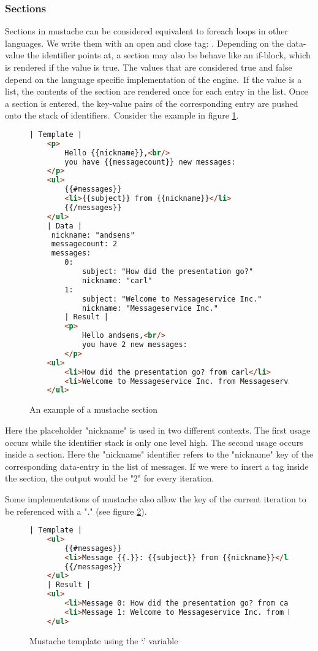 \subsubsection{Sections}
Sections in mustache can be considered equivalent to foreach loops in other
languages. We write them with an open and close tag:
.
Depending on the data-value the identifier points at, a section may also be
behave like an if-block, which is rendered if the value is true. The values that
are considered true and false depend on the language specific implementation
of the engine.\
If the value is a list, the contents of the section are rendered once for each
entry in the list. Once a section is entered, the key-value pairs of the
corresponding entry are pushed onto the stack of identifiers.\
Consider the example in figure \ref{fig:section-example.mustache}.
\begin{figure}
	\label{fig:section-example.mustache}
	\centering
	\caption{An example of a mustache section}
	\begin{lstlisting}[language=HTML]
	| Template |
	<p>
		Hello {{nickname}},<br/>
		you have {{messagecount}} new messages:
	</p>
	<ul>
		{{#messages}}
		<li>{{subject}} from {{nickname}}</li>
		{{/messages}}
	</ul>
	| Data |
	 nickname: "andsens"
	 messagecount: 2
	 messages:
	 	0:
	 		subject: "How did the presentation go?"
	 		nickname: "carl"
	 	1:
	 		subject: "Welcome to Messageservice Inc."
	 		nickname: "Messageservice Inc."
		| Result |
		<p>
			Hello andsens,<br/>
			you have 2 new messages:
		</p>
	<ul>
		<li>How did the presentation go? from carl</li>
		<li>Welcome to Messageservice Inc. from Messageservice Inc.</li>
	</ul>
	\end{lstlisting}
\end{figure}
Here the placeholder "nickname" is used in two different contexts.
The first usage occurs while the identifier stack is only one level high.
The second usage occurs inside a section. Here the "nickname" identifier refers
to the "nickname" key of the corresponding data-entry in the list of messages.
If we were to insert a \inline{\{\{messagecount\}\}} tag inside the section,
the output would be "2" for every iteration.

Some implementations of mustache also allow the key of the current iteration to
be referenced with a "." (see figure \ref{fig:dot-oper-example.mustache}).
\begin{figure}
	\label{fig:dot-oper-example.mustache}
	\centering
	\caption{Mustache template using the `.' variable}
	\begin{lstlisting}[language=HTML]
	| Template |
	<ul>
		{{#messages}}
		<li>Message {{.}}: {{subject}} from {{nickname}}</li>
		{{/messages}}
	</ul>
	| Result |
	<ul>
		<li>Message 0: How did the presentation go? from carl</li>
		<li>Message 1: Welcome to Messageservice Inc. from Messageservice Inc.</li>
	</ul>
	\end{lstlisting}
\end{figure}


